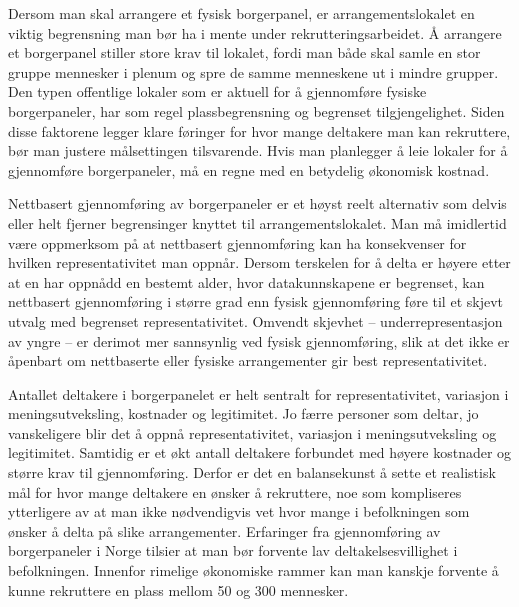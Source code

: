 \documentclass[
  12pt,
  a4paper, 12pt]{article}
\begin{document}
Dersom man skal arrangere et fysisk borgerpanel, er arrangementslokalet en viktig begrensning man bør ha i mente under rekrutteringsarbeidet. Å arrangere et borgerpanel stiller store krav til lokalet, fordi man både skal samle en stor gruppe mennesker i plenum og spre de samme menneskene ut i mindre grupper. Den typen offentlige lokaler som er aktuell for å gjennomføre fysiske borgerpaneler, har som regel plassbegrensning og begrenset tilgjengelighet. Siden disse faktorene legger klare føringer for hvor mange deltakere man kan rekruttere, bør man justere målsettingen tilsvarende. Hvis man planlegger å leie lokaler for å gjennomføre borgerpaneler, må en regne med en betydelig økonomisk kostnad.

Nettbasert gjennomføring av borgerpaneler er et høyst reelt alternativ som delvis eller helt fjerner begrensinger knyttet til arrangementslokalet. Man må imidlertid være oppmerksom på at nettbasert gjennomføring kan ha konsekvenser for hvilken representativitet man oppnår. Dersom terskelen for å delta er høyere etter at en har oppnådd en bestemt alder, hvor datakunnskapene er begrenset, kan nettbasert gjennomføring i større grad enn fysisk gjennomføring føre til et skjevt utvalg med begrenset representativitet. Omvendt skjevhet -- underrepresentasjon av yngre -- er derimot mer sannsynlig ved fysisk gjennomføring, slik at det ikke er åpenbart om nettbaserte eller fysiske arrangementer gir best representativitet.

Antallet deltakere i borgerpanelet er helt sentralt for representativitet, variasjon i meningsutveksling, kostnader og legitimitet. Jo færre personer som deltar, jo vanskeligere blir det å oppnå representativitet, variasjon i meningsutveksling og legitimitet. Samtidig er et økt antall deltakere forbundet med høyere kostnader og større krav til gjennomføring. Derfor er det en balansekunst å sette et realistisk mål for hvor mange deltakere en ønsker å rekruttere, noe som kompliseres ytterligere av at man ikke nødvendigvis vet hvor mange i befolkningen som ønsker å delta på slike arrangementer. Erfaringer fra gjennomføring av borgerpaneler i Norge tilsier at man bør forvente lav deltakelsesvillighet i befolkningen. Innenfor rimelige økonomiske rammer kan man kanskje forvente å kunne rekruttere en plass mellom 50 og 300 mennesker.
\end{document}
